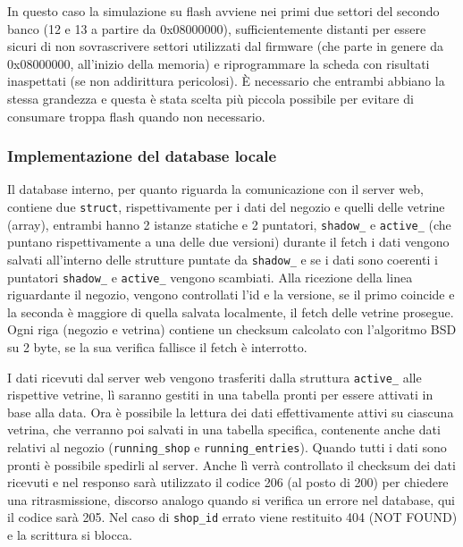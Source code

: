 In questo caso la simulazione su flash avviene nei primi due settori del secondo banco (12 e 13 a partire da 0x08000000), sufficientemente distanti per essere sicuri di non sovrascrivere settori utilizzati dal firmware (che parte in genere da 0x08000000, all'inizio della memoria) e riprogrammare la scheda con risultati inaspettati (se non addirittura pericolosi). \`E necessario che entrambi abbiano la stessa grandezza e questa \`e stata scelta pi\`u piccola possibile per evitare di consumare troppa flash quando non necessario.

\subsubsection{Implementazione del database locale}


Il database interno, per quanto riguarda la comunicazione con il server web, contiene due \texttt{struct}, rispettivamente per i dati del negozio e quelli delle vetrine (array), entrambi hanno 2 istanze statiche e 2 puntatori, \texttt{shadow\_} e \texttt{active\_} (che puntano rispettivamente a una delle due versioni) durante il fetch i dati vengono salvati all'interno delle strutture puntate da \texttt{shadow\_} e se i dati sono coerenti i puntatori \texttt{shadow\_} e \texttt{active\_} vengono scambiati. Alla ricezione della linea riguardante il negozio, vengono controllati l'id e la versione, se il primo coincide e la seconda \`e maggiore di quella salvata localmente, il fetch delle vetrine prosegue. Ogni riga (negozio e vetrina) contiene un checksum calcolato con l'algoritmo BSD su 2 byte, se la sua verifica fallisce il fetch \`e interrotto.

I dati ricevuti dal server web vengono trasferiti dalla struttura \texttt{active\_} alle rispettive vetrine, l\`i saranno gestiti in una tabella pronti per essere attivati in base alla data. Ora \`e possibile la lettura dei dati effettivamente attivi su ciascuna vetrina, che verranno poi salvati in una tabella specifica, contenente anche dati relativi al negozio (\texttt{running\_shop} e \texttt{running\_entries}). Quando tutti i dati sono pronti \`e possibile spedirli al server. Anche l\`i verr\`a controllato il checksum dei dati ricevuti e nel responso sar\`a utilizzato il codice 206 (al posto di 200) per chiedere una ritrasmissione, discorso analogo quando si verifica un errore nel database, qui il codice sar\`a 205. Nel caso di \texttt{shop\_id} errato viene restituito 404 (NOT FOUND) e la scrittura si blocca.

